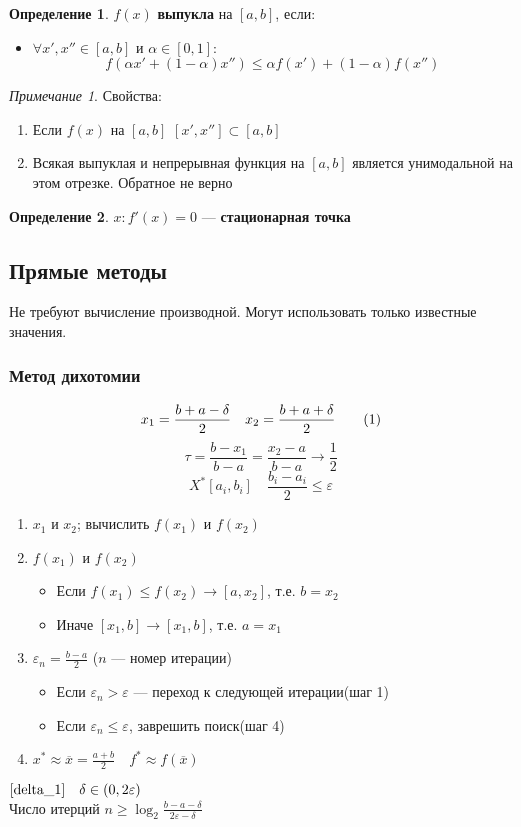 \documentclass[english]{article}
\newcommand\addtag{\refstepcounter{equation}\tag{\theequation}}
\theoremstyle{plain}
\theoremstyle{remark}
\newtheorem*{remark}{Примечание}
\theoremstyle{definition}
\newtheorem*{definition}{Определение}
\begin{document}
\begin{definition}
\(f(x)\) \textbf{выпукла} на \([a, b]\), если:
\begin{itemize}
\item \(\forall x', x'' \in [a, b]\) и \(\alpha \in [0, 1]\): \\
\[ f(\alpha x' + (1 - \alpha)x'') \le \alpha f(x') + (1 - \alpha)f(x'') \]
\end{itemize}
\end{definition}
\begin{remark}
Свойства:
\begin{enumerate}
\item Если \(f(x)\) на \([a, b]\) \([x', x''] \subset [a, b]\)
\item Всякая выпуклая и непрерывная функция на \([a, b]\) является унимодальной на этом отрезке. Обратное не верно
\end{enumerate}
\end{remark}
\begin{definition}
\(x: f'(x) = 0\) --- \textbf{стационарная точка}
\end{definition}


\subsection{Прямые методы}
\label{sec:org6b9f92e}
Не требуют вычисление производной. Могут использовать только известные значения. 
\subsubsection{Метод дихотомии}
\label{sec:org9312671}
\[ x_1 = \frac{b + a - \delta}{2}\quad x_2 = \frac{b + a + \delta}{2} \addtag\label{delta_1} \]
\[ \tau = \frac{b - x_1}{b - a} = \frac{x_2 - a}{b - a} \rightarrow \frac{1}{2} \]
\[ X^* [a_i, b_i]\quad \frac{b_i - a_i}{2} \le \varepsilon \]

\begin{enumerate}
\item \(x_1\) и \(x_2\); вычислить \(f(x_1)\) и \(f(x_2)\)
\item \(f(x_1)\) и \(f(x_2)\)
\begin{itemize}
\item Если \(f(x_1) \le f(x_2) \rightarrow [a, x_2]\), т.е. \(b = x_2\)
\item Иначе \([x_1, b] \rightarrow [x_1, b]\), т.е. \(a = x_1\)
\end{itemize}
\item \(\varepsilon_n = \frac{b - a}{2}\) (\(n\) --- номер итерации)
\begin{itemize}
\item Если \(\varepsilon_n > \varepsilon\) --- переход к следующей итерации(шаг 1)
\item Если \(\varepsilon_n \le \varepsilon\), заврешить поиск(шаг 4)
\end{itemize}
\item \(x^* \approx \overline{x} = \frac{a + b}{2} \quad f^* \approx f(\overline{x})\)
\end{enumerate}

\(\ref{delta_1}\quad \delta \in (0, 2\varepsilon)\) \\
Число итерций \(n \ge \log_2\frac{b - a - \delta}{2\varepsilon - \delta}\)
\end{document}
